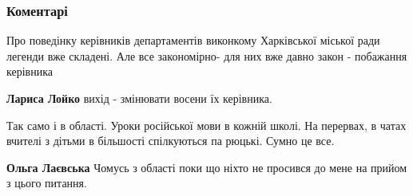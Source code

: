  
 
 
 
 
\subsubsection{Коментарі}

\begin{itemize}
 

Про поведінку керівників департаментів виконкому Харківської міської ради
легенди вже складені. Але все закономірно- для них вже давно закон - побажання
керівника

\begin{itemize}
 
\textbf{Лариса Лойко} вихід - змінювати восени їх керівника.
\end{itemize}

 

Так само і в області. Уроки російської мови в кожній школі. На перервах, в
чатах вчителі з дітьми в більшості спілкуються па рюцькі. Сумно це все.

\begin{itemize}
 
\textbf{Ольга Лаєвська} Чомусь з області поки що ніхто не просився до мене на прийом з цього питання.


\end{itemize}
\end{itemize}
